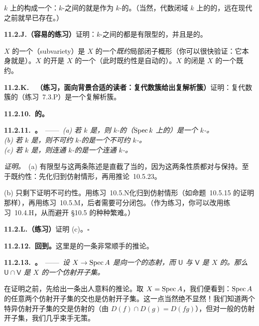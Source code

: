 $k$ 上的\trVariety{}构成一个\trCategory{}：$k$-\trVariety{}之间的\trMorphism{}就是作为 $k$-\trScheme{}的\trMorphism{}。（当然，代数闭域 $k$ 上的\trVariety{}的\trCategory{}，远在现代\trSchemeTheory{}之前就早已存在。）

\textbf{11.2.J.（容易的练习）}\quad 证明：$k$-\trVariety{}之间的\trMorphism{}都是有限型的，并且是\trSeparated{}的。

\trVariety{} $X$ 的一个\textbf{\trSubvariety{}}（subvariety）是 $X$ 的一个\emph{既约}局部闭子概形（你可以很快验证：它本身就是\trVariety）。$X$ 的开\trSubvariety{}是 $X$ 的一个\trOpenSubscheme（此时既约性是自动的）。$X$ 的闭\trSubvariety{}是 $X$ 的一个既约\trClosedSubscheme。

\textbf{11.2.K.}\ \extrahard\ \textbf{（练习，面向背景合适的读者：复代数簇给出复解析簇）}\quad 证明：复代数簇的\trAnalytification{}（\mbox{练习~7.3.P}）是一个复解析簇。

\textbf{11.2.10.\ \trVariety{}的\trProduct{}。}

\textbf{11.2.11.\ \trhProposition{}。}\ ——\ \emph{(a) 若 $k$ 是\trPerfectField，则 $k$-\trVariety{}的\trProduct（$\operatorname{Spec} k$ 上的\trFiberProduct）是一个 $k$-\trVariety。}\\
\emph{(b) 若 $k$ 是\trAlgClosedField，则不可约 $k$-\trVariety{}的\trProduct{}是一个不可约 $k$-\trVariety。}\\
\emph{(c) 若 $k$ 是\trAlgClosedField，则连通 $k$-\trVariety{}的\trProduct{}是一个连通 $k$-\trVariety。}

\emph{证明。}\ (a) 有限型与\trSeparated{}这两条陈述是直截了当的，因为这两条性质都对\trBaseChange{}与\trComposition{}保持。至于既约性：先化归到仿射情形，再用推论~10.5.23。

(b) 只剩下证明不可约性。用\mbox{练习~10.5.N}化归到仿射情形（如命题~10.5.15 的证明那样），再用\mbox{练习~10.5.M}，后者需要可分闭包。（作为练习，你可以改用\mbox{练习~10.4.H}，从而避开 \S10.5 的种种繁难。）

\textbf{11.2.L.（练习）}\quad 证明 (c)。\hfill$\square$

\textbf{11.2.12.\ 回到\trSeparatedness{}。}\quad 这里是\trSeparatedness{}的一条非常顺手的推论。

\textbf{11.2.13.\ \trhProposition{}。}\ ——\ \emph{设 $X\to\operatorname{Spec} A$ 是向一个\trAffineScheme{}的\trSeparated{}态射，而 $\mathsf{U}$ 与 $\mathsf{V}$ 是 $X$ 的\trAffine\trOpenSubset。那么 $\mathsf{U}\cap\mathsf{V}$ 是 $X$ 的一个仿射开子集。}

在证明之前，先给出一条出人意料的推论。取 $X=\operatorname{Spec} A$，我们便看到：$\operatorname{Spec} A$ 的任意两个仿射开子集的交也是仿射开子集。这一点当然绝不显然！我们知道两个特异仿射开子集的交是仿射的（由 $D(f)\cap D(g)=D(fg)$），但对一般的仿射开子集，我们几乎束手无策。


